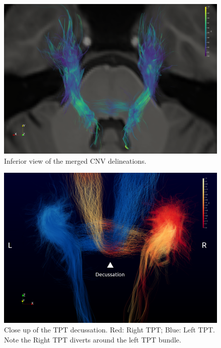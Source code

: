 \begin{figure}[ht]
\centering
\includegraphics[width=\linewidth]{cnv-inferior-view.png}
\caption{Inferior view of the merged CNV delineations.}
\label{fig:GPfigure1}
\end{figure}

\begin{figure}[ht]
\centering
\includegraphics[width=\linewidth]{view-decussation.png}
\caption{Close up of the TPT decussation. Red: Right TPT; Blue: Left TPT. Note the Right TPT diverts around the left TPT bundle. }
\label{fig:GPfigure2}
\end{figure}


